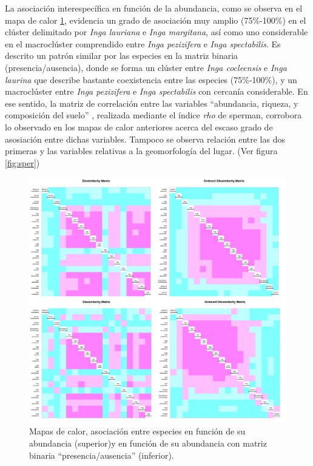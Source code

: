\documentclass[11pt,]{article}
\begin{document}
La asociación interespecífica en función de la abundancia, como se
observa en el mapa de calor \ref{fig:heat1}, evidencia un grado de
asociación muy amplio (75\%-100\%) en el clúster delimitado por
\emph{Inga lauriana} e \emph{Inga margitana}, así como uno considerable
en el macroclúster comprendido entre \emph{Inga pezizifera} e \emph{Inga
spectabilis}. Es descrito un patrón similar por las especies en la
matriz binaria (presencia/ausencia), donde se forma un clúster entre
\emph{Inga cocleensis} e \emph{Inga laurina} que describe bastante
coexistencia entre las especies (75\%-100\%), y un macroclúster entre
\emph{Inga pezizifera} e \emph{Inga spectabilis} con cercanía
considerable. En ese sentido, la matriz de correlación entre las
variables ``abundancia, riqueza, y composición del suelo'' , realizada
mediante el índice \emph{rho} de sperman, corrobora lo observado en los
mapas de calor anteriores acerca del escaso grado de asosiación entre
dichas variables. Tampoco se observa relación entre las dos primeras y
las variables relativas a la geomorfología del lugar. (Ver figura
\ref{fig:sper})

\begin{figure}
\centering
\includegraphics[width=1.00000\textwidth]{Analisis/Imagenes manuscrito/Heat_Map_R.png}
\caption{Mapas de calor, asociación entre especies en función de su
abundancia (superior)y en función de su abundancia con matriz binaria
``presencia/ausencia'' (inferior).\label{fig:heat1}}
\end{figure}
\end{document}
